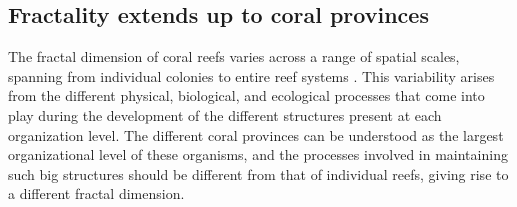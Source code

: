 \subsection{Fractality extends up to coral provinces}

The fractal dimension of coral reefs varies across a range of spatial
scales, spanning from individual colonies to entire reef systems
\cite{George2021}. This variability arises from the different physical,
biological, and ecological processes that come into play during the development
of the different structures present at each organization level. The different
coral provinces can be understood as the largest organizational level of these
organisms, and the processes involved in maintaining such big structures should
be different from that of individual reefs, giving rise to a different fractal
dimension.

